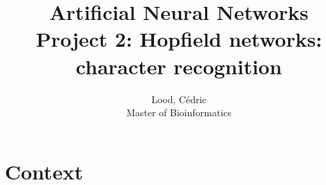 \documentclass[11pt, a4paper]{article}
\title{ \huge Artificial Neural Networks \\ 
  { \large Project 2: Hopfield networks: character recognition}}
\author{
        Lood, Cédric \\
        \small Master of Bioinformatics
}
\begin{document}
\maketitle

\section{Context}


% 
\end{document}
